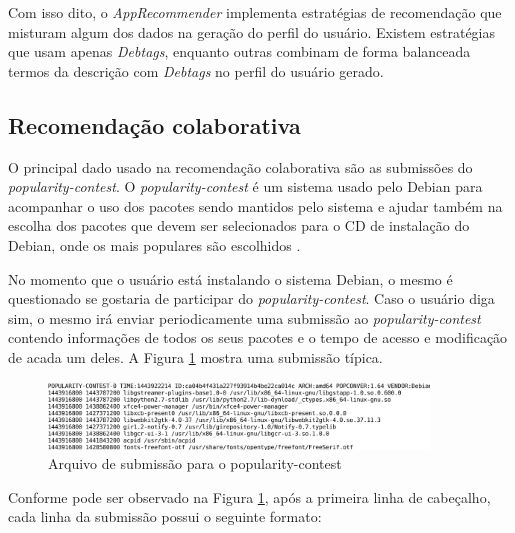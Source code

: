 Com isso dito, o \textit{AppRecommender} implementa estratégias de recomendação que
misturam algum dos dados na geração do perfil do usuário. Existem estratégias
que usam apenas \textit{Debtags}, enquanto outras combinam de forma balanceada termos da
descrição com \textit{Debtags} no perfil do usuário gerado.


\subsection{Recomendação colaborativa}

O principal dado usado na recomendação colaborativa são as submissões do
\textit{popularity-contest}. O \textit{popularity-contest} é um sistema usado pelo Debian para
acompanhar o uso dos pacotes sendo mantidos pelo sistema e ajudar também na
escolha dos pacotes que devem ser selecionados para o CD de instalação do
Debian, onde os mais populares são escolhidos \cite{araujo2011apprecommender}.

No momento que o usuário está instalando o sistema Debian, o mesmo é
questionado se gostaria de participar do
\textit{popularity-contest}. Caso o usuário diga sim, o mesmo irá enviar periodicamente
uma submissão ao \textit{popularity-contest} contendo informações de todos os seus
pacotes e o tempo de acesso e modificação de acada um deles. A Figura
\ref{fig:submissao_popcon} mostra uma submissão típica.

\begin{figure}[h]
  \centering
  \includegraphics[width=0.9\textwidth]{figuras/submissao_popcon.eps}
  \caption{Arquivo de submissão para o popularity-contest}
  \label{fig:submissao_popcon}
\end{figure}

Conforme pode ser observado na Figura \ref{fig:submissao_popcon}, após a
primeira linha de cabeçalho, cada linha da submissão possui o seguinte formato:

